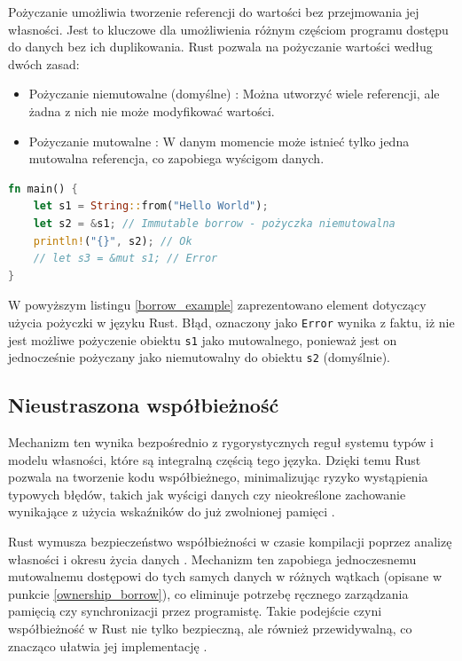 Pożyczanie  umożliwia tworzenie referencji do wartości bez przejmowania jej własności. Jest to kluczowe dla umożliwienia różnym częściom programu dostępu do danych bez ich duplikowania. Rust pozwala na pożyczanie wartości według dwóch zasad:
\begin{itemize}
    \item Pożyczanie niemutowalne (domyślne) : Można utworzyć wiele referencji, ale żadna z nich nie może modyfikować wartości.
    \item Pożyczanie mutowalne : W danym momencie może istnieć tylko jedna mutowalna referencja, co zapobiega wyścigom danych.
\end{itemize}
\begin{lstlisting}[language=Rust,caption=Przykład mechanizmu borrow, label=borrow_example]
fn main() {
    let s1 = String::from("Hello World");
    let s2 = &s1; // Immutable borrow - pożyczka niemutowalna
    println!("{}", s2); // Ok
    // let s3 = &mut s1; // Error
}
\end{lstlisting}
W powyższym listingu \ref{borrow_example} zaprezentowano element dotyczący użycia pożyczki w języku Rust. Błąd, oznaczony jako \texttt{Error} wynika z faktu, iż nie jest możliwe pożyczenie obiektu \texttt{s1} jako mutowalnego, ponieważ jest on jednocześnie pożyczany jako niemutowalny do obiektu \texttt{s2} (domyślnie).


\subsection{Nieustraszona współbieżność}
Mechanizm ten wynika bezpośrednio z rygorystycznych reguł systemu typów i modelu własności, które są integralną częścią tego języka. Dzięki temu Rust pozwala na tworzenie kodu współbieżnego, minimalizując ryzyko wystąpienia typowych błędów, takich jak wyścigi danych czy nieokreślone zachowanie wynikające z użycia wskaźników do już zwolnionej pamięci .

Rust wymusza bezpieczeństwo współbieżności w czasie kompilacji poprzez analizę własności i okresu życia danych . Mechanizm ten zapobiega jednoczesnemu mutowalnemu dostępowi do tych samych danych w różnych wątkach (opisane w punkcie \ref{ownership_borrow}), co eliminuje potrzebę ręcznego zarządzania pamięcią czy synchronizacji przez programistę. Takie podejście czyni współbieżność w Rust nie tylko bezpieczną, ale również przewidywalną, co znacząco ułatwia jej implementację \cite{RustFC}.

